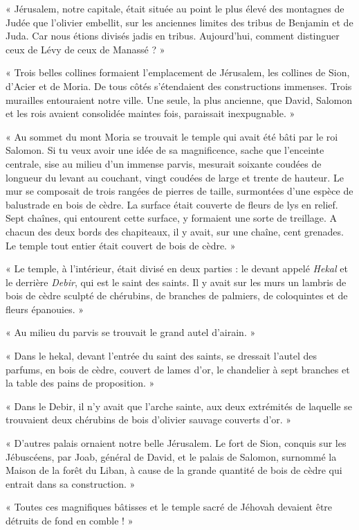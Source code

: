\documentclass[a4paper, 11pt, oneside, polutonikogreek, french]{article}
\begin{document}
« Jérusalem, notre capitale, était située au point le plus élevé des montagnes de Judée que l'olivier embellit, sur les anciennes limites des tribus de Benjamin et de Juda. Car nous étions divisés jadis en tribus. Aujourd'hui, comment distinguer ceux de Lévy de ceux de Manassé ? »

« Trois belles collines formaient l'emplacement de Jérusalem, les collines de Sion, d'Acier et de Moria. De tous côtés s'étendaient des constructions immenses. Trois murailles entouraient notre ville. Une seule, la plus ancienne, que David, Salomon et les rois avaient consolidée maintes fois, paraissait inexpugnable. »

« Au sommet du mont Moria se trouvait le temple qui avait été bâti par le roi Salomon. Si tu veux avoir une idée de sa magnificence, sache que l'enceinte centrale, sise au milieu d'un immense parvis, mesurait soixante coudées de longueur du levant au couchant, vingt coudées de large et trente de hauteur. Le mur se composait de trois rangées de pierres de taille, surmontées d'une espèce de balustrade en bois de cèdre. La surface était couverte de fleurs de lys en relief. Sept chaînes, qui entourent cette surface, y formaient une sorte de treillage. A chacun des deux bords des chapiteaux, il y avait, sur une chaîne, cent grenades. Le temple tout entier était couvert de bois de cèdre. »

« Le temple, à l'intérieur, était divisé en deux parties : le devant appelé \emph{Hekal} et le derrière \emph{Debir}, qui est le saint des saints. Il y avait sur les murs un lambris de bois de cèdre sculpté de chérubins, de branches de palmiers, de coloquintes et de fleurs épanouies. »

« Au milieu du parvis se trouvait le grand autel d'airain. »

« Dans le hekal, devant l'entrée du saint des saints, se dressait l'autel des parfums, en bois de cèdre, couvert de lames d'or, le chandelier à sept branches et la table des pains de proposition. »

« Dans le Debir, il n'y avait que l'arche sainte, aux deux extrémités de laquelle se trouvaient deux chérubins de bois d'olivier sauvage couverts d'or. »

« D'autres palais ornaient notre belle Jérusalem. Le fort de Sion, conquis sur les Jébuscéens, par Joab, général de David, et le palais de Salomon, surnommé la Maison de la forêt du Liban, à cause de la grande quantité de bois de cèdre qui entrait dans sa construction. »

« Toutes ces magnifiques bâtisses et le temple sacré de Jéhovah devaient être détruits de fond en comble ! »
\end{document}
